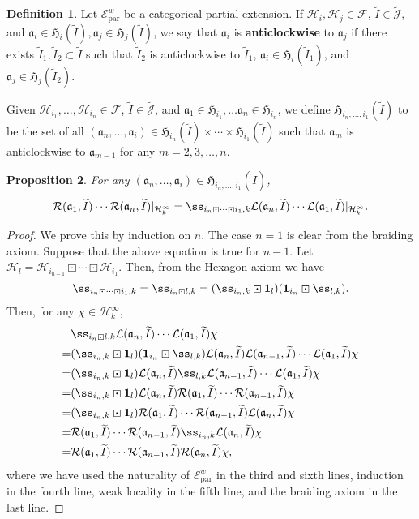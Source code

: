 \documentclass[11pt,b5paper,notitlepage]{article}
\theoremstyle{definition}
\newtheorem{df}{Definition}[subsection]
\theoremstyle{plain}
\newtheorem{pp}[df]{Proposition}
\newcommand{\fk}{\mathfrak}
\newcommand{\mc}{\mathcal}
\newcommand{\wtd}{\widetilde}
\newcommand{\id}{\mathbf{1}}
\newcommand{\loc}{\mathrm{par}}
\newcommand{\scr}{\mathscr}
\newcommand{\Jtd}{\widetilde{\mathcal J}}
\numberwithin{equation}{subsection}
\begin{document}
\begin{df}
Let $\scr E^w_\loc$ be a categorical partial extension. If $\mc H_i,\mc H_j\in\mc F$, $\wtd I\in\Jtd$, and $\fk a_i\in\fk H_i(\wtd I),\fk a_j\in\fk H_j(\wtd I)$, we say that $\fk a_i$ is \textbf{anticlockwise} to $\fk a_j$ if there exists $\wtd I_1,\wtd I_2\subset\wtd I$ such that $\wtd I_2$ is anticlockwise to $\wtd I_1$, $\fk a_i\in\fk H_i(\wtd I_1)$, and $\fk a_j\in\fk H_j(\wtd I_2)$.

Given $\mc H_{i_1},\dots,\mc H_{i_n}\in\mc F$, $\wtd I\in\Jtd$, and $\fk a_1\in\fk H_{i_1},\dots \fk a_n\in\fk H_{i_n}$, we define $\fk H_{i_n,\dots,i_1}(\wtd I)$ to be the set of all $(\fk a_n,\dots,\fk a_i)\in\fk H_{i_n}(\wtd I)\times\cdots\times\fk H_{i_1}(\wtd I)$ such that $\fk a_m$ is anticlockwise to $\fk a_{m-1}$ for any $m=2,3,\dots,n$.
\end{df}

\begin{pp}\label{lb32}
For any $(\fk a_n,\dots,\fk a_i)\in \fk H_{i_n,\dots,i_1}(\wtd I)$,
\begin{align}
\mc R(\fk a_1,\wtd I)\cdots\mc R(\fk a_n,\wtd I)|_{\mc H_k^\infty}=\ss_{i_n\boxdot\cdots\boxdot i_1,k}\mc L(\fk a_n,\wtd I)\cdots\mc L(\fk a_1,\wtd I)|_{\mc H_k^\infty}.
\end{align}
\end{pp}

\begin{proof}
We prove this by induction on $n$. The case $n=1$ is clear from the braiding axiom. Suppose that the above equation is true for $n-1$. Let $\mc H_l=\mc H_{i_{n-1}}\boxdot\cdots\boxdot\mc H_{i_1}$. Then, from the Hexagon axiom we have
\begin{align*}
\ss_{i_n\boxdot\cdots\boxdot i_1,k}=\ss_{i_n\boxdot l,k}=(\ss_{i_n,k}\boxdot\id_l)(\id_{i_n}\boxdot\ss_{l,k}).
\end{align*}
Then, for any $\chi\in\mc H_k^\infty$,
\begin{align*}
&\ss_{i_n\boxdot l,k}\mc L(\fk a_n,\wtd I)\cdots\mc L(\fk a_1,\wtd I)\chi\\
=&(\ss_{i_n,k}\boxdot\id_l)(\id_{i_n}\boxdot\ss_{l,k})\mc L(\fk a_n,\wtd I)\mc L(\fk a_{n-1},\wtd I)\cdots\mc L(\fk a_1,\wtd I)\chi\\
=& (\ss_{i_n,k}\boxdot\id_l)\mc L(\fk a_n,\wtd I)\ss_{l,k}\mc L(\fk a_{n-1},\wtd I)\cdots\mc L(\fk a_1,\wtd I)\chi\\
=&(\ss_{i_n,k}\boxdot\id_l)\mc L(\fk a_n,\wtd I)\mc R(\fk a_1,\wtd I)\cdots\mc R(\fk a_{n-1},\wtd I)\chi\\
=&(\ss_{i_n,k}\boxdot\id_l)\mc R(\fk a_1,\wtd I)\cdots\mc R(\fk a_{n-1},\wtd I)\mc L(\fk a_n,\wtd I)\chi\\
=&\mc R(\fk a_1,\wtd I)\cdots\mc R(\fk a_{n-1},\wtd I)\ss_{i_n,k}\mc L(\fk a_n,\wtd I)\chi\\
=&\mc R(\fk a_1,\wtd I)\cdots\mc R(\fk a_{n-1},\wtd I)\mc R(\fk a_n,\wtd I)\chi,
\end{align*}
where we have used the naturality of $\scr E^w_\loc$ in the third and sixth lines, induction in the fourth line,  weak locality in the fifth line, and the braiding axiom in the last line.
\end{proof}
\end{document}
